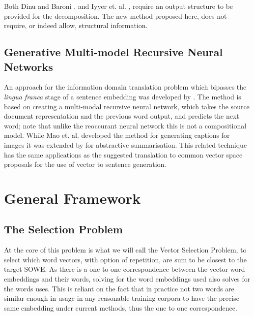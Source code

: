 \documentclass[]{scrartcl}
\numberwithin{equation}{section}
\numberwithin{figure}{section}
\theoremstyle{plain}
\theoremstyle{definition}
\begin{document}
Both Dinu and Baroni \cite{Dinu2014CompositionalGeneration}, and Iyyer et. al. \cite{iyyer2014generating}, require an output structure to be provided for the decomposition.
The new method proposed here, does not require, or indeed allow, structural information.

\subsection{Generative Multi-model Recursive Neural Networks}
An approach for the information domain translation problem which bipasses the \emph{lingua franca} stage of a sentence embedding was developed by \cite{Mao2014GenerateImageDesc}. The method is based on creating a multi-modal recursive neural network, which takes the source document representation and the previous word output, and predicts the next word; note that unlike the reoccurant neural network this is not a compositional model. While Mao et. al. developed the method for generating captions for images it was extended by \cite{TarasovGenerateAbstractSummary} for abstractive summarisation. This related technique has the same applications as the suggested translation to common vector space proposals for the use of vector to sentence generation.

\section{General Framework}
\subsection{The Selection Problem}

At the core of this problem is what we will call the Vector Selection Problem, to select which word vectors, with option of repetition, are sum to be closest to the target SOWE.
As there is a one to one correspondence between the vector word embeddings and their words, solving for the word embeddings used also solves for the words uses. This is reliant on the fact that in practice not two words are similar enough in usage in any reasonable training corpora to have the precise same embedding under current methods, thus the one to one correspondence.

\renewcommand{\c}{\tilde{c}}
\newcommand{\s}{\tilde{s}}
\newcommand{\x}{\tilde{x}}
\renewcommand{\t}{\tilde{t}}
\newcommand{\N}{\mathbb{N}}
\newcommand{\R}{\mathbb{R}}
\newcommand{\V}{\mathcal{V}}
\end{document}
